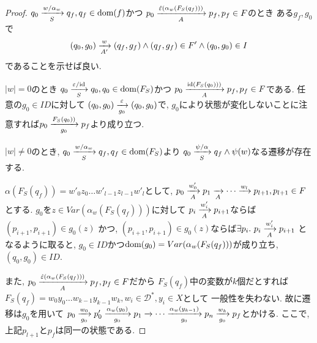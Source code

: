 \documentclass[uplatex,dvipdfmx,a4j]{jsreport}
\begin{document}
  \begin{proof}
    $q_0 \transarrow{w / \alpha_w}{S} q_f, q_f \in \dom(f)$かつ
    $p_0 \transarrow{\hat{\varepsilon}(\alpha_w(F_S(q_f)))}{A} p_f, p_f \in F$のとき
    ある$g_f, g_0$で
    \[
      (q_0, g_0) \transarrow{w}{A'} (q_f, g_f) \land (q_f, g_f) \in F' \land (q_0, g_0) \in I
    \]
    であることを示せば良い.

    $|w| = 0$のとき
    $q_0 \transarrow{\varepsilon / \scriptsize \id}{S} q_0, q_0 \in \dom(F_S)$かつ
    $p_0 \transarrow{\scriptsize \id(F_S(q_0)))}{A} p_f, p_f \in F$である.
    任意の$g_0 \in ID$に対して
    $(q_0, g_0) \transarrow{\varepsilon}{g_0} (q_0, g_0)$で,
    $g_0$により状態が変化しないことに注意すれば$p_0 \transarrow{F_S(q_0))}{g_0} p_f$より成り立つ.

    $|w| \ne 0$のとき,
    $q_0 \transarrow{w / \alpha_w}{S} q_f, q_f \in \dom(F_S)$より
    $q_0 \transarrow{\psi / \alpha}{S} q_f \land \psi(w)$なる遷移が存在する.

    $\alpha(F_S(q_f)) = w'_0z_0 \ldots w'_{l - 1}z_{l - 1}w'_l$として,
    $p_0 \transarrow{w'_0}{A} p_1 \transarrow{}{A} \cdots \transarrow{w_l}{} p_{l + 1}, p_{l + 1} \in F$
    とする.
    $g_0$を$z \in Var(\alpha_w(F_S(q_f)))$に対して
    $p_i \transarrow{w'_i}{A} p_{i + 1}$ならば$(p_{i + 1}, p_{i + 1}) \in g_0(z)$
    かつ, $(p_{i + 1}, p_{i + 1}) \in g_0(z)$ならば$\exists p_i.\ p_i \transarrow{w'_i}{A} p_{i + 1}$
    となるように取ると, $g_0 \in ID$かつ$\dom(g_0) = Var(\alpha_w(F_S(q_f)))$が成り立ち, $(q_0, g_0) \in ID$.

    また, $p_0 \transarrow{\hat{\varepsilon}(\alpha_w(F_S(q_f)))}{A} p_f, p_f \in F$だから
    $F_S(q_f)$中の変数が$k$個だとすれば
    $F_S(q_f) = w_0y_0 \ldots w_{k - 1}y_{k - 1}w_k, w_i \in \mathcal{D}^*, y_i \in X$として
    一般性を失わない. 故に遷移は$g_0$を用いて
    $p_0 \transarrow{w_0}{g_0} p'_0 \transarrow{\alpha_w(y_0)}{g_0}
    p_1 \transarrow{}{} \cdots \transarrow{\alpha_w(y_{k - 1})}{g_0}
    p_n \transarrow{w_k}{g_0} p_f$とかける.
    ここで, 上記$p_{l + 1}$と$p_f$は同一の状態である.


\end{proof}
\end{document}
